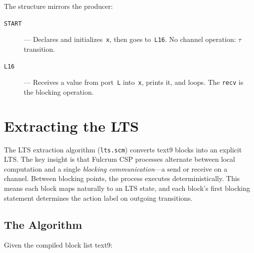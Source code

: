 \documentclass[11pt]{article}
\begin{document}
The structure mirrors the producer:

\begin{description}
\item[\texttt{START}] --- Declares and initializes~\texttt{x}, then
  goes to~\texttt{L16}.  No channel operation: $\tau$ transition.

\item[\texttt{L16}] --- Receives a value from port~\texttt{L}
  into~\texttt{x}, prints it, and loops.  The \texttt{recv} is the
  blocking operation.
\end{description}

\section{Extracting the LTS}
\label{sec:extraction}

The LTS extraction algorithm (\texttt{lts.scm}) converts text9 blocks
into an explicit LTS.  The key insight is that Fulcrum CSP processes
alternate between local computation and a single
\emph{blocking communication}---a send or receive on a channel.
Between blocking points, the process executes deterministically.
This means each block maps naturally to an LTS state, and each
block's first blocking statement determines the action label on
outgoing transitions.

\subsection{The Algorithm}

Given the compiled block list text9:
\end{document}
